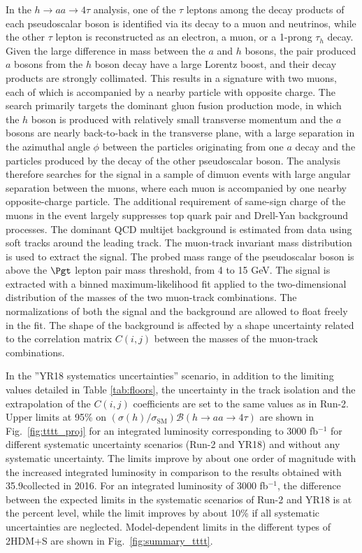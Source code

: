 In the $h\to aa\to4\tau$ analysis, one of the $\tau$ leptons among the decay products of each pseudoscalar boson
is identified via its decay to a muon and neutrinos, while the other $\tau$ lepton is reconstructed as an electron, a muon, or a 1-prong $\tau_h$ decay.
Given the large difference in mass between the $a$ and $h$ bosons, the pair produced $a$ bosons
from the $h$ boson decay have a large Lorentz boost,
and their decay products are strongly collimated. This results in a signature with two muons, each of which is
accompanied by a nearby particle with opposite charge.
The search primarily targets the dominant gluon fusion production mode, in which the $h$ boson is produced with
relatively small transverse momentum and the $a$ bosons are nearly back-to-back in the transverse plane,
with a large separation in the azimuthal angle $\phi$ between the particles originating from one $a$ decay
 and the particles produced by the decay of the other pseudoscalar boson.
The analysis therefore searches for the signal in a sample of dimuon events with large angular separation
between the muons, where each muon is accompanied by one nearby opposite-charge particle.
The additional requirement of same-sign charge of the muons in the event largely suppresses top quark pair and Drell-Yan
background processes. The dominant QCD multijet background is estimated from data using soft tracks
around the leading track. The muon-track invariant mass distribution is used to extract the signal.
The probed mass range of the pseudoscalar boson is above the $\Pgt$ lepton pair mass threshold,  from 4 to 15 GeV.
The signal is extracted with a binned maximum-likelihood fit applied to the two-dimensional distribution of the masses
of the two muon-track combinations.
The normalizations of both the signal and the background are allowed to float freely in the fit.
The shape of the background is affected by a shape uncertainty related to the correlation matrix $C(i,j)$ between
the masses of the muon-track combinations.

In the ''YR18 systematics uncertainties'' scenario, in addition to the limiting values detailed in Table \ref{tab:floors}, the uncertainty in the track isolation and the extrapolation of the $C(i,j)$ coefficients are set to the same values as in Run-2. Upper limits at 95\% \CL on $(\sigma(h)/\sigma_{\textrm{SM}})\mathcal{B}(h \to aa \to 4\tau)$ are shown in Fig.~\ref{fig:tttt_proj} for an integrated luminosity corresponding to 3000 fb$^{-1}$ for different systematic uncertainty scenarios
(Run-2 and YR18) and without any systematic uncertainty. The limits improve by about one order of magnitude with the increased integrated luminosity in comparison to the results obtained with 35.9\fbinv collected in 2016.
For an integrated luminosity of 3000 fb$^{-1}$, the difference between the expected limits in the systematic scenarios
of Run-2 and YR18 is at the percent level, while the limit improves by about 10\% if all systematic uncertainties are neglected. Model-dependent limits in the different types of 2HDM+S are shown in Fig.~\ref{fig:summary_tttt}.

